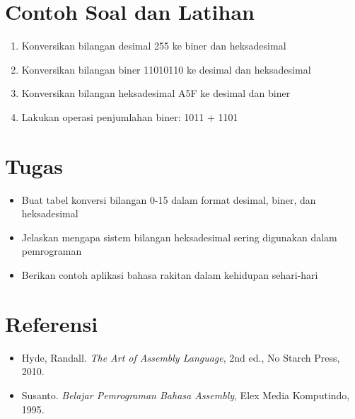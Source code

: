 \section{Contoh Soal dan Latihan}
\begin{enumerate}
\item Konversikan bilangan desimal 255 ke biner dan heksadesimal
\item Konversikan bilangan biner 11010110 ke desimal dan heksadesimal
\item Konversikan bilangan heksadesimal A5F ke desimal dan biner
\item Lakukan operasi penjumlahan biner: 1011 + 1101
\end{enumerate}

\section{Tugas}
\begin{itemize}
\item Buat tabel konversi bilangan 0-15 dalam format desimal, biner, dan heksadesimal
\item Jelaskan mengapa sistem bilangan heksadesimal sering digunakan dalam pemrograman
\item Berikan contoh aplikasi bahasa rakitan dalam kehidupan sehari-hari
\end{itemize}

\section{Referensi}
\begin{itemize}
\item Hyde, Randall. \textit{The Art of Assembly Language}, 2nd ed., No Starch Press, 2010.
\item Susanto. \textit{Belajar Pemrograman Bahasa Assembly}, Elex Media Komputindo, 1995.
\end{itemize}

